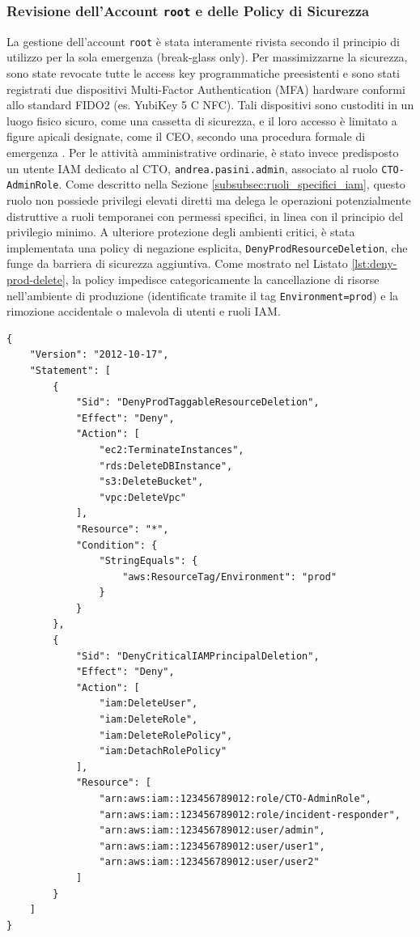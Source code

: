 \subsubsection{Revisione dell'Account \texttt{root} e delle Policy di Sicurezza}
La gestione dell'account \texttt{root} è stata interamente rivista secondo il principio di utilizzo per la sola emergenza (break-glass only). Per massimizzarne la sicurezza, sono state revocate tutte le access key programmatiche preesistenti e sono stati registrati due dispositivi Multi-Factor Authentication (MFA) hardware conformi allo standard FIDO2 (es. YubiKey 5 C NFC). Tali dispositivi sono custoditi in un luogo fisico sicuro, come una cassetta di sicurezza, e il loro accesso è limitato a figure apicali designate, come il CEO, secondo una procedura formale di emergenza \cite{saraswat:breakglass, clouddefense:mfa}.
Per le attività amministrative ordinarie, è stato invece predisposto un utente IAM dedicato al CTO, \texttt{andrea.pasini.admin}, associato al ruolo \texttt{CTO-AdminRole}. Come descritto nella Sezione \ref{subsubsec:ruoli_specifici_iam}, questo ruolo non possiede privilegi elevati diretti ma delega le operazioni potenzialmente distruttive a ruoli temporanei con permessi specifici, in linea con il principio del privilegio minimo.
A ulteriore protezione degli ambienti critici, è stata implementata una policy di negazione esplicita, \texttt{DenyProdResourceDeletion}, che funge da barriera di sicurezza aggiuntiva. Come mostrato nel Listato \ref{lst:deny-prod-delete}, la policy impedisce categoricamente la cancellazione di risorse nell'ambiente di produzione (identificate tramite il tag \texttt{Environment=prod}) e la rimozione accidentale o malevola di utenti e ruoli IAM.
\begin{lstlisting}[style=json, caption={Policy IAM per negare eliminazioni in produzione}, label=lst:deny-prod-delete]
  {
    "Version": "2012-10-17",
    "Statement": [
        {
            "Sid": "DenyProdTaggableResourceDeletion",
            "Effect": "Deny",
            "Action": [
                "ec2:TerminateInstances",
                "rds:DeleteDBInstance",
                "s3:DeleteBucket",
                "vpc:DeleteVpc"
            ],
            "Resource": "*",
            "Condition": {
                "StringEquals": {
                    "aws:ResourceTag/Environment": "prod"
                }
            }
        },
        {
            "Sid": "DenyCriticalIAMPrincipalDeletion",
            "Effect": "Deny",
            "Action": [
                "iam:DeleteUser",
                "iam:DeleteRole",
                "iam:DeleteRolePolicy",
                "iam:DetachRolePolicy"
            ],
            "Resource": [
                "arn:aws:iam::123456789012:role/CTO-AdminRole",
                "arn:aws:iam::123456789012:role/incident-responder",
                "arn:aws:iam::123456789012:user/admin",
                "arn:aws:iam::123456789012:user/user1",
                "arn:aws:iam::123456789012:user/user2"
            ]
        }
    ]
}
\end{lstlisting}

